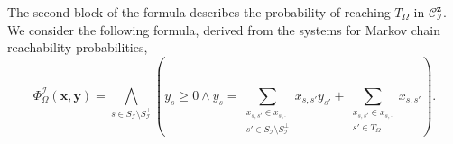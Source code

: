 \documentclass[a4paper,UKenglish,cleveref,autoref,thm-restate,colorlinks]{lipics-v2021}
\newcommand{\mdpStateSpace}{S}
\newcommand{\ocConfig}{s}
\newcommand{\mchain}{\mathcal{C}}
\newcommand{\intPart}{\mathcal{I}}
\newcommand{\compressChainStrat}[1]{\mchain^{#1}_{\intPart}}
\newcommand{\compressChainStateSpace}{\mdpStateSpace_{\intPart}}
\newcommand{\compressChainStateSpaceStar}{\mdpStateSpace_{\intPart}^{\bot}}
\newcommand{\varTrans}{x}
\newcommand{\varTransTuple}{\mathbf{\varTrans}}
\newcommand{\varObj}{y}
\newcommand{\varObjTuple}{\mathbf{\varObj}}
\newcommand{\varStrat}{z}
\newcommand{\varStratTuple}{\mathbf{\varStrat}}
\newcommand{\compressChainSymbolic}{\compressChainStrat{\varStratTuple}}
\newcommand{\formulaObjBase}{\Phi_{\objective}}
\newcommand{\formulaObj}{\formulaObjBase^\intPart}
\newcommand{\objective}{\Omega}
\newcommand{\target}{T}
\begin{document}
The second block of the formula describes the probability of reaching $\target_\objective$ in $\compressChainSymbolic$.
We consider the following formula, derived from the systems for Markov chain reachability probabilities,
\begin{equation}\label{equation:verification:formula:objective}
  \formulaObj(\varTransTuple, \varObjTuple) =
  \bigwedge_{\ocConfig\in\compressChainStateSpace\setminus\compressChainStateSpaceStar}
  \left(
    \varObj_{\ocConfig}\geq 0\land
    \varObj_{\ocConfig} =
    \sum_{\substack{
        \varTrans_{\ocConfig, \ocConfig'}\in\varTrans_{\ocConfig, \cdot}\\
        \ocConfig'\in\compressChainStateSpace\setminus\compressChainStateSpaceStar}
    }
    \varTrans_{\ocConfig, \ocConfig'}\varObj_{\ocConfig'} +
    \sum_{\substack{
        \varTrans_{\ocConfig, \ocConfig'}\in\varTrans_{\ocConfig, \cdot}\\
        \ocConfig'\in\target_\objective}}
    \varTrans_{\ocConfig, \ocConfig'}
  \right).
\end{equation}
\end{document}
